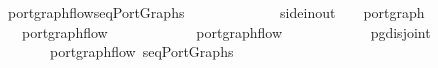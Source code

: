 \ port{\isacharunderscore}graph{\isacharunderscore}flow{\isacharunderscore}seqPortGraphs{\isacharcolon}\isanewline
\ \ \ \ \ \ \ \ \ \ {\isacharcolon}{\isacharcolon}\ {\isachardoublequoteopen}{\isacharparenleft}\ {\isacharcolon}{\isacharcolon}\ side{\isacharunderscore}in{\isacharunderscore}out{\isacharcomma}\ \ \ \ port{\isacharunderscore}graph{\isachardoublequoteclose}\isanewline
\ \ \ {\isachardoublequoteopen}port{\isacharunderscore}graph{\isacharunderscore}flow\ \isanewline
\ \ \ \ \ \ \ \ \ \ \ {\isachardoublequoteopen}port{\isacharunderscore}graph{\isacharunderscore}flow\ \isanewline
\ \ \ \ \ \ \ \ \ \ \ {\isachardoublequoteopen}pg{\isacharunderscore}disjoint\ \isanewline
\ \ \ \ \ \ \ {\isachardoublequoteopen}port{\isacharunderscore}graph{\isacharunderscore}flow\ {\isacharparenleft}seqPortGraphs\ 
